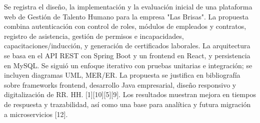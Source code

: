 Se registra el diseño, la implementación y la evaluación inicial de una plataforma web de Gestión de Talento Humano para la empresa "Las Brisas". La propuesta combina autenticación con control de roles, módulos de empleados y contratos, registro de asistencia, gestión de permisos e incapacidades, capacitaciones/inducción, y generación de certificados laborales. La arquitectura se basa en el API REST con Spring Boot y un frontend en React, y persistencia en MySQL. Se siguió un enfoque iterativo con pruebas unitarias e integración; se incluyen diagramas UML, MER/ER. La propuesta se justifica en bibliografía sobre frameworks frontend, desarrollo Java empresarial, diseño responsivo y digitalización de RR. HH. [1][10][5][9]. Los resultados muestran mejora en tiempos de respuesta y trazabilidad, así como una base para analítica y futura migración a microservicios [12].